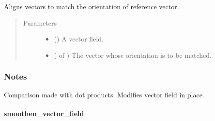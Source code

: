 \documentclass[letterpaper,10pt,english]{sphinxmanual}
\begin{document}
\begin{fulllineitems}
\label{\detokenize{api/generated/directional_clustering.transformations.align_vector_field:directional_clustering.transformations.align_vector_field}}
Aligns vectors to match the orientation of reference vector.
\begin{quote}\begin{description}
\item[{Parameters}] \leavevmode\begin{itemize}
\item {} 
 () \textendash{} A vector field.

\item {} 
 ( of ) \textendash{} The vector whose orientation is to be matched.

\end{itemize}

\end{description}\end{quote}
\subsubsection*{Notes}

Comparison made with dot products.
Modifies vector field in place.

\end{fulllineitems}



\paragraph{smoothen\_vector\_field}
\label{\detokenize{api/generated/directional_clustering.transformations.smoothen_vector_field:smoothen-vector-field}}\label{\detokenize{api/generated/directional_clustering.transformations.smoothen_vector_field::doc}}
\end{document}
